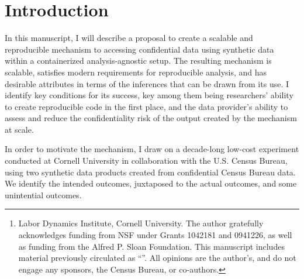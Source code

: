 \documentclass[12pt,titlepage]{article}
\date{\myversion
\\ \vspace*{3em}{THIS VERSION PRELIMINARY AND INCOMPLETE: PLEASE DO NOT CITE}
}
\title{\mytitle}
\author{\myauthorA%
\thanks{Labor Dynamics Institute, Cornell University. The author gratefully acknowledges funding from NSF under Grants 1042181 and 0941226, as well as funding from the Alfred P. Sloan Foundation. This manuscript includes material previously circulated as ``\prevtitle{}''. All opinions are the author's, and do not engage any sponsors, the Census Bureau, or co-authors. }}
\begin{document}

\maketitle








\begin{abstract}

\acresetall
\end{abstract}


\section{Introduction}

In this manuscript, I will describe a proposal to create a scalable and reproducible mechanism to accessing confidential data using synthetic data within a containerized analysis-agnostic setup. The resulting mechanism is scalable, satisfies modern requirements for reproducible analysis, and has desirable attributes in terms of the inferences that can be drawn from its use. I identify key conditions for its success, key among them being researchers' ability to create reproducible code in the first place, and the data provider's ability to assess and reduce the confidentiality risk of the output created by the mechanism at scale.

In order to motivate the mechanism, I draw on a decade-long low-cost experiment conducted at Cornell University in collaboration with the U.S. Census Bureau, using two synthetic data products created from confidential Census Bureau data. We identify the intended outcomes, juxtaposed to the actual outcomes, and some unintential outcomes. 
\end{document}
